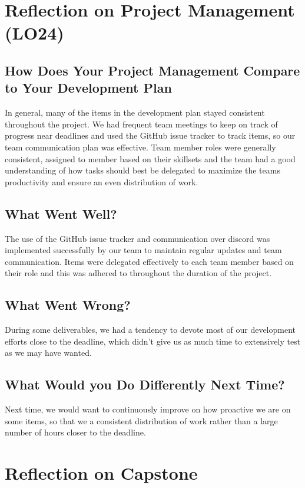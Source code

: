 \documentclass{article}
\begin{document}
\section{Reflection on Project Management (LO24)}

\subsection{How Does Your Project Management Compare to Your Development Plan}

In general, many of the items in the development plan stayed consistent throughout the project. We had frequent team meetings
to keep on track of progress near deadlines and used the GitHub issue tracker to track items, so our team communication plan
was effective. Team member roles were generally consistent, assigned to member based on their skillsets and the team had a good
understanding of how tasks should best be delegated to maximize the teams productivity and ensure an even distribution of work.

\subsection{What Went Well?}

The use of the GitHub issue tracker and communication over discord was implemented successfully by our team to maintain regular
updates and team communication. Items were delegated effectively to each team member based on their role and this was adhered
to throughout the duration of the project.

\subsection{What Went Wrong?}

During some deliverables, we had a tendency to devote most of our development efforts close to the deadline, which didn't give
us as much time to extensively test as we may have wanted.

\subsection{What Would you Do Differently Next Time?}

Next time, we would want to continuously improve on how proactive we are on some items, so that we a consistent distribution of work
rather than a large number of hours closer to the deadline.

\section{Reflection on Capstone}
\end{document}
